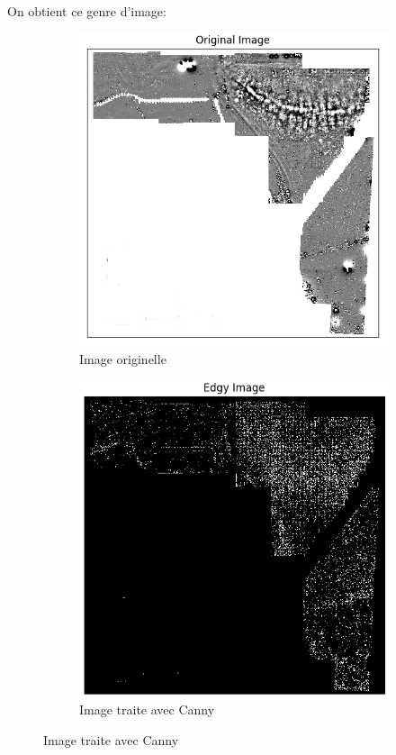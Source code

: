 \documentclass[a4paper, 12pt, titlepage, oneside]{article}
\begin{document}
	\newpage
	On obtient ce genre d'image:\\
	\begin{figure}[!h]
		\centering
		\begin{subfigure}[b]{0.4\linewidth}
			\includegraphics[width=\linewidth]{Canny1a.png}
			\caption{Image originelle}
		\end{subfigure}
		\begin{subfigure}[b]{0.4\linewidth}
			\includegraphics[width=\linewidth]{Canny1b.png}
			\caption{Image traite avec Canny}
		\end{subfigure}
		\label{fig:canny}
	\end{figure}
\end{document}
